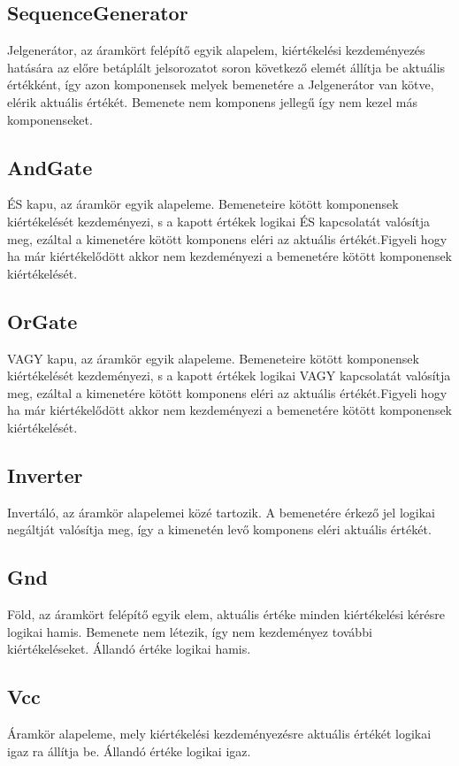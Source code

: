 \subsection{\bf SequenceGenerator}
Jelgenerátor, az áramkört felépítő egyik alapelem, kiértékelési kezdeményezés hatására az előre betáplált jelsorozatot soron következő elemét állítja be aktuális értékként, így azon komponensek melyek bemenetére a Jelgenerátor van kötve, elérik aktuális értékét. Bemenete nem komponens jellegű így nem kezel más komponenseket.

\subsection{\bf AndGate}
ÉS kapu, az áramkör egyik alapeleme. Bemeneteire kötött komponensek kiértékelését kezdeményezi, s a kapott értékek logikai ÉS kapcsolatát valósítja meg, ezáltal a kimenetére kötött komponens eléri az aktuális értékét.Figyeli hogy ha már kiértékelődött akkor nem kezdeményezi a bemenetére kötött komponensek kiértékelését.

\subsection{\bf OrGate}
VAGY kapu, az áramkör egyik alapeleme. Bemeneteire kötött komponensek kiértékelését kezdeményezi, s a kapott értékek logikai VAGY kapcsolatát valósítja meg, ezáltal a kimenetére kötött komponens eléri az aktuális értékét.Figyeli hogy ha már kiértékelődött akkor nem kezdeményezi a bemenetére kötött komponensek kiértékelését.

\subsection{\bf Inverter}
Invertáló, az áramkör alapelemei közé tartozik. A bemenetére érkező jel logikai negáltját valósítja meg, így a kimenetén levő komponens eléri aktuális értékét.

\subsection{\bf Gnd}
Föld, az áramkört felépítő egyik elem, aktuális értéke minden kiértékelési kérésre logikai hamis. Bemenete nem létezik, így nem kezdeményez további kiértékeléseket. Állandó értéke logikai hamis.

\subsection{\bf Vcc}
Áramkör alapeleme, mely kiértékelési kezdeményezésre aktuális értékét logikai igaz ra állítja be. Állandó értéke logikai igaz.

